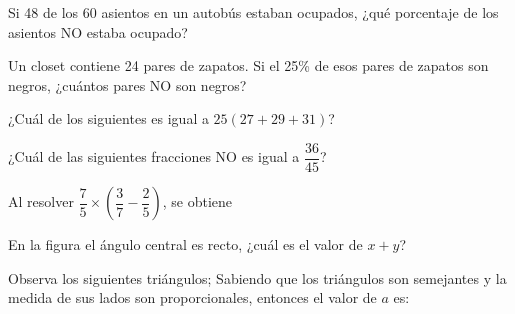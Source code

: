 \documentclass[letterpaper,10pt]{examdesign}
\begin{document}
\begin{multiplechoice}[keycolumns=4,examcolumns=2]
\begin{block}[questions=2]
\begin{question}
\end{question}
\end{block}
\begin{question}
Si 48 de los 60 asientos en un autobús estaban ocupados, ¿qué porcentaje de los asientos NO estaba ocupado?
\end{question}
\begin{question}
Un closet contiene 24 pares de zapatos. Si el 25\% de esos pares de zapatos son negros, ¿cuántos pares NO son negros?
\end{question}
\begin{question}
¿Cuál de los siguientes es igual a $25(27+29+31)$?
\end{question}
\begin{question}
¿Cuál de las siguientes fracciones NO es igual a $\dfrac{36}{45}$?
\end{question}
\begin{question}
Al resolver $\dfrac{7}{5}\times \left(\dfrac{3}{7}-\dfrac{2}{5}\right)$, se obtiene
\end{question}
\begin{question}
En la figura el \'angulo central es recto, ¿cuál es el valor de $x+y$?
\begin{center}
\end{center}
\end{question}
\begin{question}
Observa los siguientes triángulos; 
Sabiendo que los triángulos son semejantes y la medida de sus lados son proporcionales, entonces el valor de $a$ es:
\begin{center}
\begin{tikzpicture}[scale=.3]

\end{tikzpicture}
\end{center}
\end{question}
\end{multiplechoice}
\end{document}
